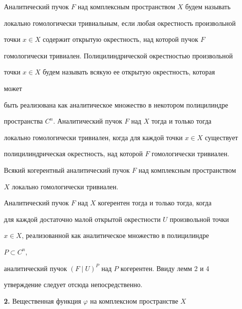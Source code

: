  


Аналитический пучок $F$ над комплексным пространством $X$ будем называть 


локально гомологически тривиальным, если любая окрестность произвольной 


точки $x\in X$ содержит открытую окрестность, над которой пучок $F$ 


гомологически тривиален. Полицилиндрической окрестностью произвольной 


точки $x\in X$ будем называть всякую ее открытую окрестность, которая 


может 


быть реализована как аналитическое множество в некотором полицилиндре 


пространства $C^n$. Аналитический пучок $F$ над $X$ тогда и только тогда 


локально гомологически тривиален, когда для каждой точки $x\in X$ существует 


полицилиндрическая окрестность, над которой $F$ гомологически тривиален. 


 


\begin{thm} 


Всякий когерентный аналитический пучок $F$ над комплексным пространством 


$X$ локально гомологически тривиален. 


\end{thm} 


 


\begin{pf} 


Аналитический пучок $F$ над $X$ когерентен тогда и только тогда, когда 


для каждой достаточно малой открытой окрестности $U$ произвольной точки 


$x\in X$, реализованной как аналитическое множество в полицилиндре 


$P\subset C^n$, 


аналитический пучок $(F\mid U)^P$ над $P$ когерентен. Ввиду лемм 2 и 4 


утверждение следует отсюда непосредственно. 


\end{pf} 


 


{\bf 2.} Вещественная функция $\varphi$ на комплексном пространстве $X$ 


